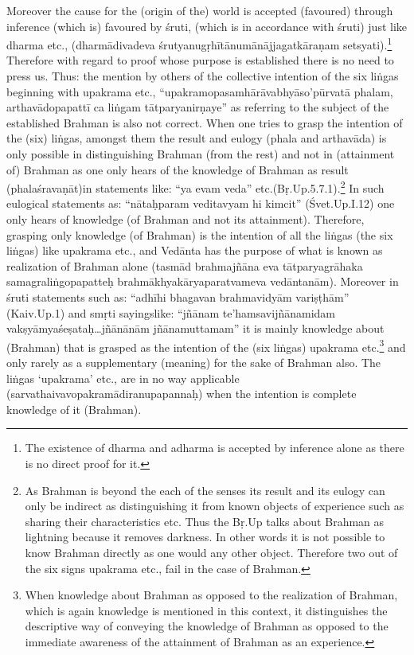 Moreover the cause for the (origin of the) world is accepted (favoured) through inference (which is) favoured by śruti, (which is in accordance with śruti) just like dharma etc., (dharmādivadeva śrutyanugṛhītānu\-mānājjagatkāraṇam setsyati).\footnote{The existence of dharma and adharma is accepted by inference alone as there is no direct proof for it.} Therefore with regard to proof whose purpose is established there is no need to press us. Thus: the mention by others of the collective intention of the six liṅgas beginning with upakrama etc., “upakramopasamhārāvabhyāso’pūrvatā phalam, arthavādopapattī ca liṅgam tātparyanirṇaye” as referring to the subject of the established Brahman is also not correct. When one tries to grasp the intention of the (six) liṅgas, amongst them the result and eulogy (phala and arthavāda) is only possible in distinguishing Brahman (from the rest) and not in (attainment of) Brahman as one only hears of the knowledge of Brahman as result (phalaśravaṇāt)in statements like: “ya evam veda” etc.(Bṛ.Up.5.7.1).\footnote{As Brahman is beyond the each of the senses its result and its eulogy can only be indirect as distinguishing it from known objects of experience such as sharing their characteristics etc. Thus the Bṛ.Up talks about Brahman as lightning because it removes darkness. In other words it is not possible to know Brahman directly as one would any other object. Therefore two out of the six signs upakrama etc., fail in the case of Brahman.} In such eulogical statements as: “nātaḥparam veditavyam hi kimcit” (Śvet.Up.I.12) one only hears of knowledge (of Brahman and not its attainment). Therefore, grasping only knowledge (of Brahman) is the intention of all the liṅgas (the six liṅgas) like upakrama etc., and Vedānta has the purpose of what is known as realization of Brahman alone (tasmād brahmajñāna eva tātparyagrāhaka samagraliṅgopapatteḥ brahmākhyakāryaparatvameva vedāntanām). Moreover in śruti statements such as: “adhīhi bhagavan brahmavidyām variṣṭhām” (Kaiv.Up.1) and smṛti sayings\break like: “jñānam te’hamsavijñānamidam vakṣyāmyaśeṣataḥ…jñānānām jñānamuttamam” it is mainly knowledge about (Brahman) that is gras\-ped as the intention of the (six liṅgas) upakrama etc.\footnote{When knowledge about Brahman as opposed to the realization of Brahman, which is again knowledge is mentioned in this context, it distinguishes the descriptive way of conveying the knowledge of Brahman as opposed to the immediate awareness of the attainment of Brahman as an experience.} and only rarely as a supplementary (meaning) for the sake of Brahman also. The liṅgas ‘upakrama’ etc., are in no way applicable  (sarvathaivavopakramādiranupapannaḥ) when the intention is  complete knowledge of it (Brahman).

